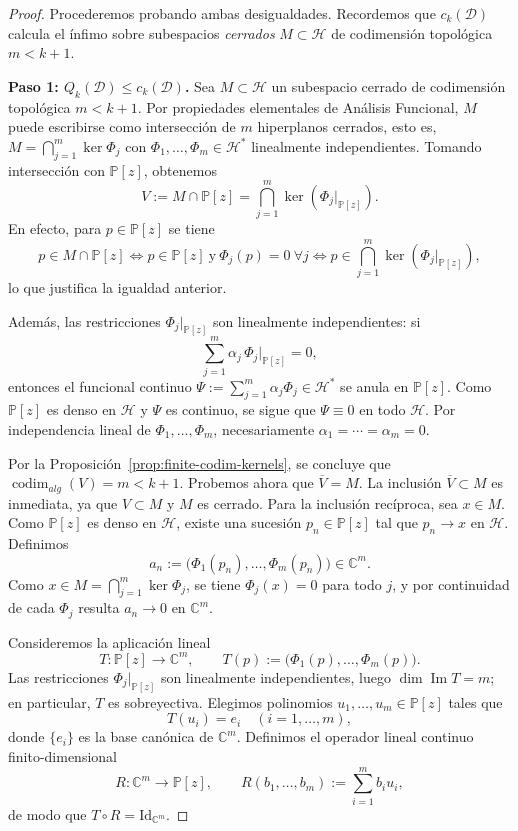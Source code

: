 \documentclass[12pt,a4paper]{article}
\theoremstyle{definition}
\theoremstyle{remark}
\begin{document}
\begin{proof}
	Procederemos probando ambas desigualdades. Recordemos que $c_k(\mathcal{D})$ calcula el ínfimo sobre subespacios \textit{cerrados} $M \subset \mathcal{H}$ de codimensión topológica $m < k+1$.

	\textbf{Paso 1: $Q_k(\mathcal{D}) \le c_k(\mathcal{D})$.}
	Sea $M \subset \mathcal{H}$ un subespacio cerrado de codimensión topológica $m < k+1$. Por propiedades elementales de Análisis Funcional, $M$ puede escribirse como intersección de $m$ hiperplanos cerrados, esto es, $M=\bigcap_{j=1}^m\ker\Phi_j$ con $\Phi_1,\dots,\Phi_m\in\mathcal{H}^*$ linealmente independientes. Tomando intersección con $\mathbb{P}[z]$, obtenemos
	\[
		V:=M\cap\mathbb{P}[z]=\bigcap_{j=1}^m\ker(\Phi_j|_{\mathbb{P}[z]}).
	\]
	En efecto, para $p\in\mathbb{P}[z]$ se tiene
	\[
		p\in M\cap\mathbb{P}[z]
		\iff p\in\mathbb{P}[z]\ \text{y}\ \Phi_j(p)=0\ \forall j
		\iff p\in\bigcap_{j=1}^m\ker(\Phi_j|_{\mathbb{P}[z]}),
	\]
	lo que justifica la igualdad anterior.

	Además, las restricciones $\Phi_j|_{\mathbb{P}[z]}$ son linealmente independientes: si
	\[
		\sum_{j=1}^m \alpha_j\,\Phi_j|_{\mathbb{P}[z]}=0,
	\]
	entonces el funcional continuo $\Psi:=\sum_{j=1}^m \alpha_j\Phi_j\in\mathcal{H}^*$ se anula en $\mathbb{P}[z]$. Como $\mathbb{P}[z]$ es denso en $\mathcal{H}$ y $\Psi$ es continuo, se sigue que $\Psi\equiv 0$ en todo $\mathcal{H}$. Por independencia lineal de $\Phi_1,\dots,\Phi_m$, necesariamente $\alpha_1=\cdots=\alpha_m=0$.

	Por la Proposición~\ref{prop:finite-codim-kernels}, se concluye que $\operatorname{codim}_{alg}(V)=m<k+1$.
	Probemos ahora que $\overline V=M$. La inclusión $\overline V\subset M$ es inmediata, ya que $V\subset M$ y $M$ es cerrado. Para la inclusión recíproca, sea $x\in M$. Como $\mathbb P[z]$ es denso en $\mathcal H$, existe una sucesión $p_n\in \mathbb P[z]$ tal que $p_n\to x$ en $\mathcal H$. Definimos
	\[
		a_n:=\bigl(\Phi_1(p_n),\dots,\Phi_m(p_n)\bigr)\in\mathbb C^m.
	\]
	Como $x\in M=\bigcap_{j=1}^m\ker\Phi_j$, se tiene $\Phi_j(x)=0$ para todo $j$, y por continuidad de cada $\Phi_j$ resulta $a_n\to 0$ en $\mathbb C^m$.

	Consideremos la aplicación lineal
	\[
		T:\mathbb P[z]\to\mathbb C^m,\qquad T(p):=\bigl(\Phi_1(p),\dots,\Phi_m(p)\bigr).
	\]
	Las restricciones $\Phi_j|_{\mathbb P[z]}$ son linealmente independientes, luego $\dim\operatorname{Im}T=m$; en particular, $T$ es sobreyectiva. Elegimos polinomios $u_1,\dots,u_m\in\mathbb P[z]$ tales que
	\[
		T(u_i)=e_i\quad (i=1,\dots,m),
	\]
	donde $\{e_i\}$ es la base canónica de $\mathbb C^m$. Definimos el operador lineal continuo finito-dimensional
	\[
		R:\mathbb C^m\to\mathbb P[z],\qquad R(b_1,\dots,b_m):=\sum_{i=1}^m b_i u_i,
	\]
	de modo que $T\circ R=\mathrm{Id}_{\mathbb C^m}$.


\end{proof}
\end{document}

